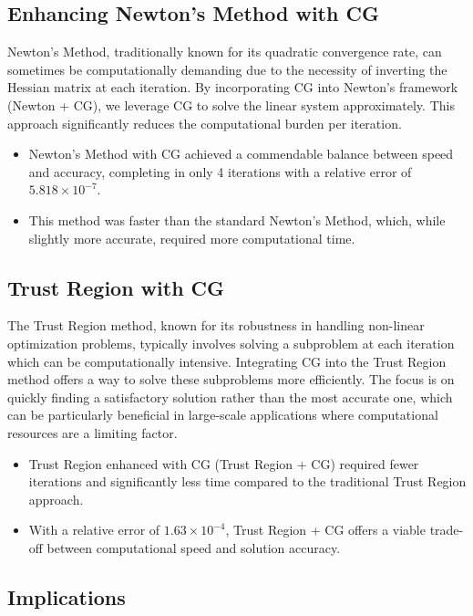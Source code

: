 \documentclass[11pt]{article}
\begin{document}
\subsection{Enhancing Newton's Method with CG}

Newton's Method, traditionally known for its quadratic convergence rate, can sometimes be computationally demanding due to the necessity of inverting the Hessian matrix at each iteration. By incorporating CG into Newton's framework (Newton + CG), we leverage CG to solve the linear system approximately. This approach significantly reduces the computational burden per iteration.

\begin{itemize}
    \item Newton's Method with CG achieved a commendable balance between speed and accuracy, completing in only 4 iterations with a relative error of $5.818 \times 10^{-7}$.
    \item This method was faster than the standard Newton's Method, which, while slightly more accurate, required more computational time.
\end{itemize}

\subsection{Trust Region with CG}

The Trust Region method, known for its robustness in handling non-linear optimization problems, typically involves solving a subproblem at each iteration which can be computationally intensive. Integrating CG into the Trust Region method offers a way to solve these subproblems more efficiently. The focus is on quickly finding a satisfactory solution rather than the most accurate one, which can be particularly beneficial in large-scale applications where computational resources are a limiting factor.

\begin{itemize}
    \item Trust Region enhanced with CG (Trust Region + CG) required fewer iterations and significantly less time compared to the traditional Trust Region approach.
    \item With a relative error of $1.63 \times 10^{-4}$, Trust Region + CG offers a viable trade-off between computational speed and solution accuracy.
\end{itemize}

\subsection{Implications}
\end{document}
